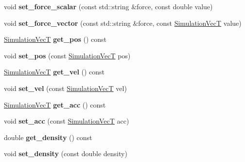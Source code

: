 \begin{DoxyCompactItemize}
void {\bfseries set\+\_\+force\+\_\+scalar} (const std\+::string \&force, const double value)
\item 
\mbox{\label{classwash_1_1Particle_a6960cdd169d1829a52e49cf835a8bfeb}} 
void {\bfseries set\+\_\+force\+\_\+vector} (const std\+::string \&force, const \mbox{\hyperlink{classwash_1_1Vec}{Simulation\+VecT}} value)
\item 
\mbox{\label{classwash_1_1Particle_a9d222d453d640cf629ee8dfbee6b43c2}} 
\mbox{\hyperlink{classwash_1_1Vec}{Simulation\+VecT}} {\bfseries get\+\_\+pos} () const
\item 
\mbox{\label{classwash_1_1Particle_af06835533935c04e594c258a7dcdd1ef}} 
void {\bfseries set\+\_\+pos} (const \mbox{\hyperlink{classwash_1_1Vec}{Simulation\+VecT}} pos)
\item 
\mbox{\label{classwash_1_1Particle_a890d0f1467225393e385872b0c98b974}} 
\mbox{\hyperlink{classwash_1_1Vec}{Simulation\+VecT}} {\bfseries get\+\_\+vel} () const
\item 
\mbox{\label{classwash_1_1Particle_a4755365883cfd62117ebe74fe44d35e0}} 
void {\bfseries set\+\_\+vel} (const \mbox{\hyperlink{classwash_1_1Vec}{Simulation\+VecT}} vel)
\item 
\mbox{\label{classwash_1_1Particle_afb8c9dce2692cdfab61a3a87fde50610}} 
\mbox{\hyperlink{classwash_1_1Vec}{Simulation\+VecT}} {\bfseries get\+\_\+acc} () const
\item 
\mbox{\label{classwash_1_1Particle_a395e095de0b2af7dfc925bedef2090a1}} 
void {\bfseries set\+\_\+acc} (const \mbox{\hyperlink{classwash_1_1Vec}{Simulation\+VecT}} acc)
\item 
\mbox{\label{classwash_1_1Particle_a8c0ce3f48b189fd8550c3bfab17eec68}} 
double {\bfseries get\+\_\+density} () const
\item 
\mbox{\label{classwash_1_1Particle_a6416678dd509c16c2933d315b6ae6156}} 
void {\bfseries set\+\_\+density} (const double density)
\item 

\end{DoxyCompactItemize}
